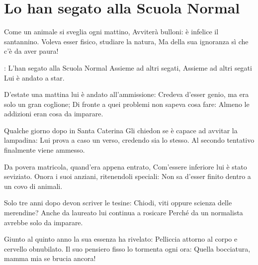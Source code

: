 \section{Lo han segato alla Scuola Normal}
\subtitle{Sulla melodia di “Whiskey in the Jar”, versione dei Dubliners}
\begin{canzone}
Come un animale si sveglia ogni mattino,
Avviterà bulloni: è infelice il santannino.
Voleva esser fisico, studiare la natura,
Ma della sua ignoranza sì che c’è da aver paura!

\ARIT: L’han segato alla Scuola Normal
\aritskip Assieme ad altri segati,
\aritskip Assieme ad altri segati
\aritskip Lui è andato a star.

D’estate una mattina lui è andato all’ammissione:
Credeva d’esser genio, ma era solo un gran coglione;
Di fronte a quei problemi non sapeva cosa fare:
Almeno le addizioni eran cosa da imparare.

\RIT

Qualche giorno dopo in Santa Caterina
Gli chiedon se è capace ad avvitar la lampadina:
Lui prova a caso un verso, credendo sia lo stesso.
Al secondo tentativo finalmente viene ammesso.

\RIT

Da povera matricola, quand’era appena entrato,
Com’essere inferiore lui è stato seviziato.
Onora i suoi anziani, ritenendoli speciali:
Non sa d’esser finito dentro a un covo di animali.

\RIT

Solo tre anni dopo devon scriver le tesine:
Chiodi, viti oppure scienza delle merendine?
Anche da laureato lui continua a rosicare
Perché da un normalista avrebbe solo da imparare.

\RIT

Giunto al quinto anno la sua essenza ha rivelato:
Pelliccia attorno al corpo e cervello obnubilato.
Il suo pensiero fisso lo tormenta ogni ora:
Quella bocciatura, mamma mia se brucia ancora!

\RITB
\end{canzone}
